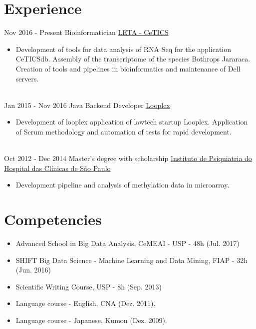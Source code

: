 \documentclass[letterpaper]{twentysecondcv} %
\begin{document}

\section{Experience}

\begin{twenty} %
\twentyitem
    	{Nov 2016 - }
		{Present}
        {Bioinformatician}
        {\href{http://cetics.butantan.gov.br/}{LETA - CeTICS}}
        {}
        {\begin{itemize}
        \item Development of tools for data analysis of RNA Seq for the application CeTICSdb. Assembly of the transcriptome of the species Bothrops Jararaca. Creation of tools and pipelines in bioinformatics and maintenance of Dell servers.
        \end{itemize}}
        \\
	\twentyitem
    	{Jan 2015 - }
		{Nov 2016}
        {Java Backend Developer }
        {\href{www.looplex.com.br/}{Looplex}}
        {}
        {
        {\begin{itemize}
        \item Development of looplex application of lawtech startup Looplex. Application of Scrum methodology and automation of tests for rapid development. 
    \end{itemize}}
        }
    \\   
    \twentyitem
   		{Oct 2012 - }
		{Dec 2014}
        {Master's degree with scholarship}
        {\href{www.ipqhc.org.br}{Instituto de Psiquiatria do Hospital das Clínicas de São Paulo}}
        {}
        {
        {\begin{itemize}
        \item Development pipeline and analysis of methylation data in microarray.
    \end{itemize}}
        }       
\end{twenty}

\section{Competencies}
\begin{itemize}
	\item Advanced School in Big Data Analysis, CeMEAI - USP - 48h (Jul. 2017)
	\item SHIFT Big Data Science - Machine Learning and Data Mining, FIAP - 32h (Jun. 2016)
	\item Scientific Writing Course, USP - 8h (Sep. 2013)
	\item Language course - English, CNA (Dez. 2011).
	\item Language course - Japanese, Kumon (Dez. 2009).
\end{itemize}
\end{document}
